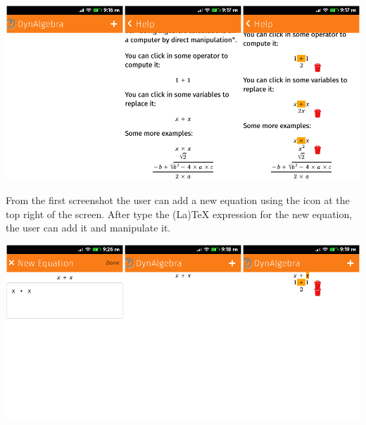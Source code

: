 \href{http://r-gaia-cs.github.io/DynAlgebra/}{\includegraphics[width=\textwidth]{screenshots/10-dynalgebra-A.png}}

From the first screenshot the user can add a new equation using the icon at the
top right of the screen. After type the (La)TeX expression for the new equation,
the user can add it and manipulate it.

\href{http://r-gaia-cs.github.io/DynAlgebra/}{\includegraphics[width=\textwidth]{screenshots/10-dynalgebra-B.png}}
